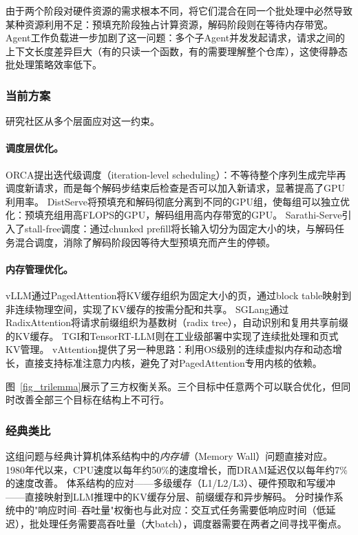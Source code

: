 由于两个阶段对硬件资源的需求根本不同，将它们混合在同一个批处理中必然导致某种资源利用不足：预填充阶段独占计算资源，解码阶段则在等待内存带宽。
Agent工作负载进一步加剧了这一问题：多个子Agent并发发起请求，请求之间的上下文长度差异巨大（有的只读一个函数，有的需要理解整个仓库），这使得静态批处理策略效率低下。

\subsubsection{当前方案}
研究社区从多个层面应对这一约束。

\paragraph{调度层优化。}
ORCA\cite{orca2022}提出迭代级调度（iteration-level scheduling）：不等待整个序列生成完毕再调度新请求，而是每个解码步结束后检查是否可以加入新请求，显著提高了GPU利用率。
DistServe\cite{zhong2024distserve}将预填充和解码彻底分离到不同的GPU组，使每组可以独立优化：预填充组用高FLOPS的GPU，解码组用高内存带宽的GPU。
Sarathi-Serve\cite{agrawal2024sarathi}引入了stall-free调度：通过chunked prefill将长输入切分为固定大小的块，与解码任务混合调度，消除了解码阶段因等待大型预填充而产生的停顿。

\paragraph{内存管理优化。}
vLLM\cite{kwon2023pagedattention,vllm_docs_2026}通过PagedAttention将KV缓存组织为固定大小的页，通过block table映射到非连续物理空间，实现了KV缓存的按需分配和共享。
SGLang\cite{sglang2024,sglang_docs_2026}通过RadixAttention将请求前缀组织为基数树（radix tree），自动识别和复用共享前缀的KV缓存。
TGI\cite{tgi_docs_2026}和TensorRT-LLM\cite{tensorrtllm_docs_2026}则在工业级部署中实现了连续批处理和页式KV管理。
vAttention\cite{prabhu2024vattention}提供了另一种思路：利用OS级别的连续虚拟内存和动态增长，直接支持标准注意力内核，避免了对PagedAttention专用内核的依赖。

图~\ref{fig_trilemma}展示了三方权衡关系。三个目标中任意两个可以联合优化，但同时改善全部三个目标在结构上不可行。


\subsubsection{经典类比}
这组问题与经典计算机体系结构中的\emph{内存墙}（Memory Wall）问题直接对应。
1980年代以来，CPU速度以每年约50\%的速度增长，而DRAM延迟仅以每年约7\%的速度改善\cite{hennessy2017quantitative}。
体系结构的应对——多级缓存（L1/L2/L3）、硬件预取和写缓冲——直接映射到LLM推理中的KV缓存分层、前缀缓存和异步解码。
分时操作系统中的"响应时间--吞吐量"权衡也与此对应：交互式任务需要低响应时间（低延迟），批处理任务需要高吞吐量（大batch），调度器需要在两者之间寻找平衡点\cite{ostep_2023}。

